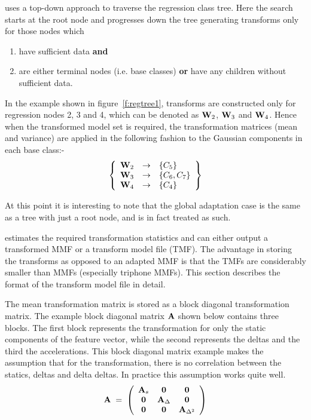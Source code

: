 uses a top-down approach to traverse the regression
class tree. Here the search starts at the root node and progresses
down the tree generating transforms only for those nodes which
\begin{enumerate}
\item have sufficient data \textbf{and}
\item are either terminal nodes (i.e. base classes) \textbf{or} have
any children without sufficient data.
\end{enumerate}

In the example shown in figure~\ref{f:regtree1}, transforms are constructed
only for regression nodes 2, 3 and 4, which can be denoted as
${\bf W}_2$, ${\bf W}_3$ and ${\bf W}_4$. Hence when the transformed
model set is required, the transformation matrices (mean and variance)
are applied in the following fashion to the Gaussian components in
each base class:-
\[
        \left\{
        \begin{array}{ccl}
                {\bf W}_2 & \rightarrow & \left\{C_5\right\} \\
                {\bf W}_3 & \rightarrow & \left\{C_6, C_7\right\} \\
                {\bf W}_4 & \rightarrow & \left\{C_4\right\}
        \end{array}
        \right\}
\]

At this point it is interesting to note that the global adaptation
case is the same as a tree with just a root node, and is in fact
treated as such.


 estimates the required transformation statistics and can
either output a transformed MMF or a transform model file 
(TMF). The
advantage in storing the transforms as opposed to an adapted
MMF is that the TMFs are considerably smaller than MMFs (especially
triphone MMFs). This
section describes the format of the transform model file in detail.


The mean transformation matrix is stored as a block diagonal
transformation matrix.
The example block diagonal matrix ${\bf A}$ shown below contains three
blocks. The first block represents the transformation for only the
static components of the feature vector, while the second represents
the deltas and the third the accelerations. This block diagonal matrix
example makes the assumption that for the transformation, there is no
correlation between the statics, deltas and delta deltas. In practice
this assumption works quite well.
\[
        {\bf A} \; = \; \left(
                        \begin{array}{ccc}
                        {\bf A}_s & {\bf 0}        & {\bf 0}       \\
                        {\bf 0}   & {\bf A}_\Delta & {\bf 0}       \\
                        {\bf 0}   & {\bf 0}        & {\bf A}_{\Delta^2}
                        \end{array}
                        \right)
\]

